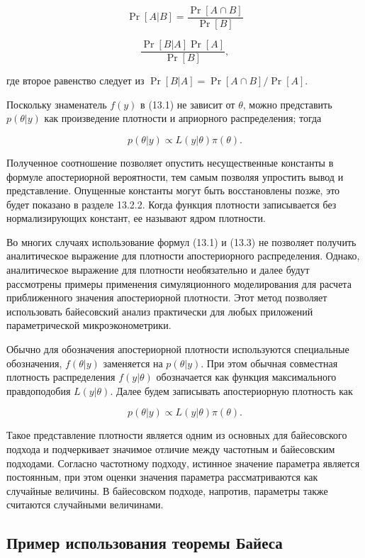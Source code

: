\[
\Pr[A|B]=\dfrac{\Pr[A{\cap}B]}{\Pr[B]}
\]

\[
\dfrac{\Pr[B|A]\Pr[A]}{\Pr[B]},
\]

где второе равенство следует из $\Pr[B|A]=\Pr[A{\cap}B]/\Pr[A]$.

Поскольку знаменатель $f(y)$ в (13.1) не зависит от $\theta$, можно представить $p(\theta|y)$ как произведение плотности  и априорного распределения; тогда

\begin{equation}
p(\theta|y){\propto}L(y|\theta)\pi(\theta).
\end{equation}

Полученное соотношение позволяет опустить несущественные константы в формуле апостериорной вероятности, тем самым позволяя упростить вывод и представление. Опущенные константы  могут быть восстановлены позже, это будет показано в разделе 13.2.2. Когда функция плотности записывается без нормализирующих констант, ее называют ядром плотности. 

Во многих случаях использование формул (13.1) и (13.3) не позволяет получить аналитическое выражение для плотности апостериорного распределения. Однако, аналитическое выражение для плотности необязательно и  далее будут рассмотрены примеры применения симуляционного моделирования для расчета приближенного значения апостериорной плотности. Этот  метод позволяет использовать байесовский анализ практически для любых приложений параметрической микроэконометрики.

Обычно для обозначения апостериорной плотности используются специальные обозначения, $f(\theta|y)$ заменяется на $p(\theta|y)$. При этом обычная совместная плотность распределения $f(y|\theta)$ обозначается как функция максимального правдоподобия $L(y|\theta)$. Далее будем записывать апостериорную плотность как

\begin{equation}
p(\theta|y){\propto}L(y|\theta)\pi(\theta).
\end{equation}

Такое представление плотности является одним из основных для байесовского подхода и подчеркивает значимое отличие между частотным и байесовским подходами. Согласно частотному подходу, истинное значение параметра является постоянным, при этом оценки значения параметра рассматриваются как случайные величины. В  байесовском подходе, напротив, параметры также считаются случайными величинами.

\subsection{Пример использования теоремы Байеса}

